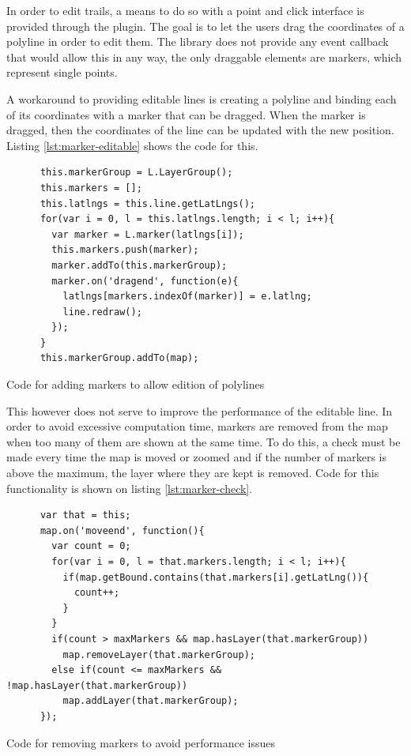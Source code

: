 In order to edit trails, a means to do so with a point and click interface is provided through the plugin. The goal is to let the users drag the coordinates of a polyline in order to edit them. The library does not provide any event callback that would allow this in any way, the only draggable elements are markers, which represent single points.

A workaround to providing editable lines is creating a polyline and binding each of its coordinates with a marker that can be dragged. When the marker is dragged, then the coordinates of the line can be updated with the new position. Listing \ref{lst:marker-editable} shows the code for this.

\begin{listing}[ht]\centering
  \begin{minipage}{.7\textwidth}
    \begin{verbatim}
      this.markerGroup = L.LayerGroup();
      this.markers = [];
      this.latlngs = this.line.getLatLngs();
      for(var i = 0, l = this.latlngs.length; i < l; i++){
        var marker = L.marker(latlngs[i]);
        this.markers.push(marker);
        marker.addTo(this.markerGroup);
        marker.on('dragend', function(e){
          latlngs[markers.indexOf(marker)] = e.latlng;
          line.redraw();
        });
      }
      this.markerGroup.addTo(map);
    \end{verbatim}
  \end{minipage}
  \caption{Code for adding markers to allow edition of polylines}\label{lst:marker-editable}
\end{listing}

This however does not serve to improve the performance of the editable line. In order to avoid excessive computation time, markers are removed from the map when too many of them are shown at the same time. To do this, a check must be made every time the map is moved or zoomed and if the number of markers is above the maximum, the layer where they are kept is removed. Code for this functionality is shown on listing \ref{lst:marker-check}.

\begin{listing}[ht]\centering
  \begin{minipage}{.75\textwidth}
    \begin{verbatim}
      var that = this;
      map.on('moveend', function(){
        var count = 0;
        for(var i = 0, l = that.markers.length; i < l; i++){
          if(map.getBound.contains(that.markers[i].getLatLng()){
            count++;
          }
        }
        if(count > maxMarkers && map.hasLayer(that.markerGroup))
          map.removeLayer(that.markerGroup);
        else if(count <= maxMarkers && !map.hasLayer(that.markerGroup))
          map.addLayer(that.markerGroup);
      });
    \end{verbatim}
  \end{minipage}
  \caption{Code for removing markers to avoid performance issues}\label{lst:marker-check}
\end{listing}

